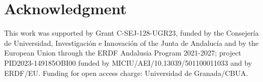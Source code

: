 \documentclass[journal]{IEEEtran}
\begin{document}




\section*{Acknowledgment}

This work was supported by Grant C-SEJ-128-UGR23, funded by the Consejería de Universidad, Investigación e Innovación of the Junta de Andalucía and by the European Union through the ERDF Andalusia Program 2021-2027; project PID2023-149185OBI00 funded by MICIU/AEI/10.13039/501100011033 and by ERDF/EU. Funding for open access charge: Universidad de Granada/CBUA.


\ifCLASSOPTIONcaptionsoff
  \newpage
\fi









%
\end{document}
